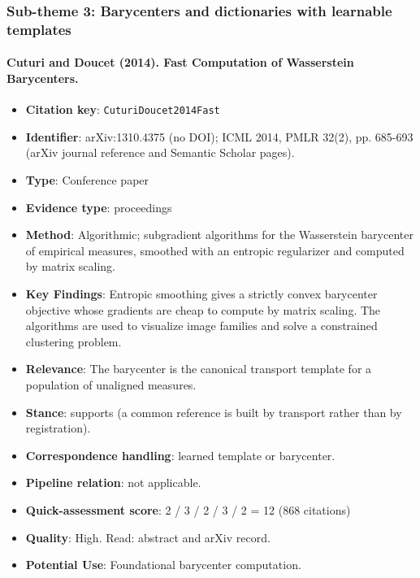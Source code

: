 \documentclass[journal,onecolumn]{IEEEtran}
\begin{document}
\subsubsection{Sub-theme 3: Barycenters and dictionaries with learnable templates}

\paragraph{Cuturi and Doucet (2014). Fast Computation of Wasserstein Barycenters.~\cite{CuturiDoucet2014Fast}}\mbox{}

\begin{itemize}

\item{} \textbf{Citation key}: \texttt{CuturiDoucet2014Fast}

\item{} \textbf{Identifier}: arXiv:1310.4375 (no DOI); ICML 2014, PMLR 32(2), pp. 685-693 (arXiv journal reference and Semantic Scholar pages).

\item{} \textbf{Type}: Conference paper

\item{} \textbf{Evidence type}: proceedings

\item{} \textbf{Method}: Algorithmic; subgradient algorithms for the Wasserstein barycenter of empirical measures, smoothed with an entropic regularizer and computed by matrix scaling.

\item{} \textbf{Key Findings}: Entropic smoothing gives a strictly convex barycenter objective whose gradients are cheap to compute by matrix scaling. The algorithms are used to visualize image families and solve a constrained clustering problem.

\item{} \textbf{Relevance}: The barycenter is the canonical transport template for a population of unaligned measures.

\item{} \textbf{Stance}: supports (a common reference is built by transport rather than by registration).

\item{} \textbf{Correspondence handling}: learned template or barycenter.

\item{} \textbf{Pipeline relation}: not applicable.

\item{} \textbf{Quick-assessment score}: 2 / 3 / 2 / 3 / 2 = 12 (868 citations)

\item{} \textbf{Quality}: High. Read: abstract and arXiv record.

\item{} \textbf{Potential Use}: Foundational barycenter computation.

\end{itemize}
\end{document}
